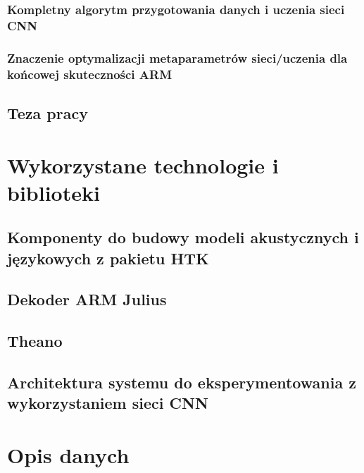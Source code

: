 \documentclass[11pt]{article}
\begin{document}
		\subsubsection{ Kompletny algorytm przygotowania danych i uczenia sieci CNN }
		\subsubsection{ Znaczenie optymalizacji metaparametrów sieci/uczenia dla końcowej skuteczności ARM }	
	\subsection{ Teza pracy }

\section{ Wykorzystane technologie i biblioteki }
	\subsection{ Komponenty do budowy modeli akustycznych i językowych z pakietu HTK }
	\subsection{ Dekoder ARM Julius }
	\subsection{ Theano }
	\subsection{ Architektura systemu do eksperymentowania z wykorzystaniem sieci CNN }
		
\section{Opis danych}
	\label{sec:opis_danych}
\end{document}
